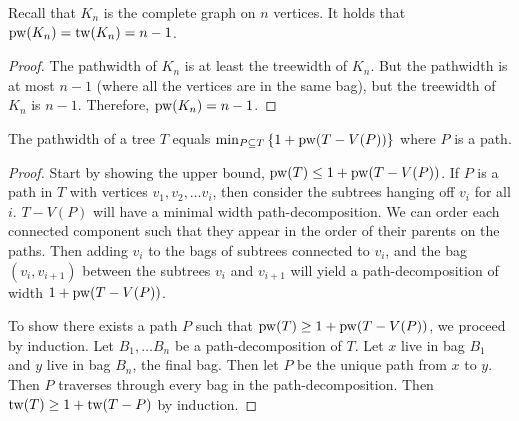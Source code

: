 \begin{example}
	Recall that $K_n$ is the complete graph on $n$ vertices. It holds that \(\operatorname{pw}(K_n) = \operatorname{tw}(K_n) = n - 1\).
\end{example}
\begin{proof}
	The pathwidth of \(K_n\) is at least the treewidth of \(K_n\). But the pathwidth is at most \(n- 1\) (where all the vertices are in the same bag), but the treewidth of \(K_n\) is \(n - 1\). Therefore, \(\operatorname{pw}(K_n) = n - 1\).
\end{proof}

\begin{proposition}
	The pathwidth of a tree \(T\) equals \(\min_{P \subseteq T} \left\lbrace 1 + \operatorname{pw}(T - V(P))\right\rbrace \) where \(P\) is a path.
\end{proposition}

\begin{proof}[Proof]
	Start by showing the upper bound, \(\operatorname{pw}(T) \leq 1 + \operatorname{pw}(T - V(P))\). If \(P\) is a path in \(T\) with vertices \(v_1, v_2, \ldots v_i\), then consider the subtrees hanging off \(v_i\) for all \(i\). \(T - V(P)\) will have a minimal width path-decomposition. We can order each connected component such that they appear in the order of their parents on the paths. Then adding \(v_i\) to the bags of subtrees connected to \(v_i\), and the bag \((v_i, v_{i+1})\) between the subtrees \(v_i\) and \(v_{i + 1}\) will yield a path-decomposition of width \(1 + \operatorname{pw}(T - V(P))\).
	\par
	To show there exists a path \(P\) such that \(\operatorname{pw}(T) \geq 1 + \operatorname{pw}(T - V(P))\), we proceed by induction. Let \(B_1, \ldots B_n\) be a path-decomposition of \(T\). Let \(x\) live in bag \(B_1\) and \(y\) live in bag \(B_n\), the final bag. Then let \(P\) be the unique path from \(x\) to \(y\). Then \(P\) traverses through every bag in the path-decomposition. Then \(\operatorname{tw}(T) \geq 1 + \operatorname{tw}(T - P)\) by induction.
\end{proof}
